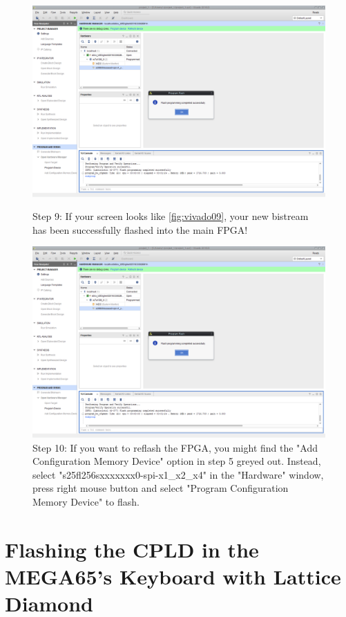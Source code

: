 \begin{figure}[H]
  \centering
  \includegraphics[width=0.8\linewidth]{images/vivado09.png}
  \captionsetup{width=0.8\linewidth}
  \caption{Step 9: If your screen looks like \ref{fig:vivado09},
           your new bistream has been successfully flashed into the main FPGA!}
  \label{fig:vivado09}

\vspace{5mm}

  \includegraphics[width=0.8\linewidth]{images/vivado09.png}
  \captionsetup{width=0.8\linewidth}
  \caption{Step 10: If you want to reflash the FPGA, you might find the
  "Add Configuration Memory Device" option in step 5 greyed out.
   Instead, select "s25fl256sxxxxxxx0-spi-x1\_x2\_x4"  in the "Hardware"
   window, press right mouse button and select "Program Configuration
   Memory Device" to flash.}
  \label{fig:vivado10}
\end{figure}


\section{Flashing the CPLD in the MEGA65's Keyboard with Lattice Diamond}



